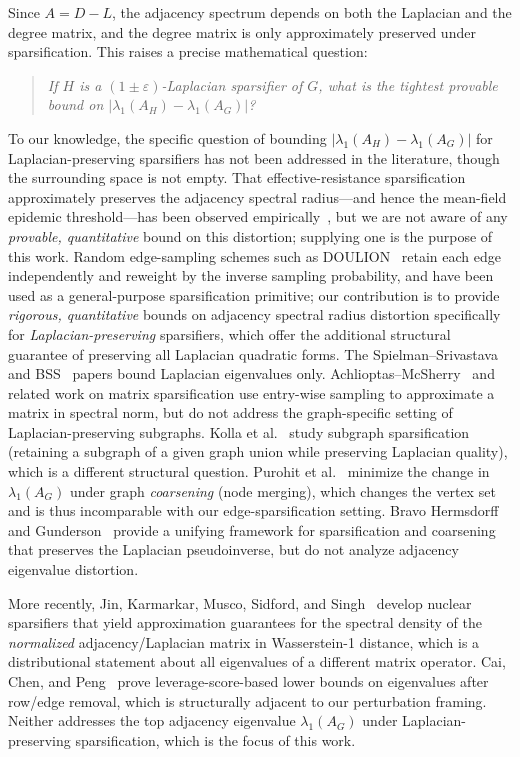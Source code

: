 \documentclass[11pt]{article}
\theoremstyle{definition}
\newcommand{\eps}{\varepsilon}
\newcommand{\lamH}{\lambda_1(A_H)}
\newcommand{\lamG}{\lambda_1(A_G)}
\begin{document}
Since $A = D - L$, the adjacency spectrum depends on both the Laplacian and the degree
matrix, and the degree matrix is only approximately preserved under sparsification. This
raises a precise mathematical question:

\begin{quote}
\emph{If $H$ is a $(1 \pm \eps)$-Laplacian sparsifier of $G$, what is the tightest
provable bound on $|\lamH - \lamG|$?}
\end{quote}

\noindent To our knowledge, the specific question of bounding $|\lamH - \lamG|$ for
Laplacian-preserving sparsifiers has not been addressed in the literature, though the
surrounding space is not empty. That effective-resistance sparsification approximately
preserves the adjacency spectral radius---and hence the mean-field epidemic
threshold---has been observed empirically~\citep{mercier2022effective}, but we are not
aware of any \emph{provable, quantitative} bound on this distortion; supplying one is
the purpose of this work.
Random edge-sampling schemes such as DOULION~\citep{tsourakakis2009doulion}
retain each edge independently and reweight by the inverse sampling probability,
and have been used as a general-purpose sparsification primitive; our contribution
is to provide \emph{rigorous, quantitative} bounds on adjacency spectral radius
distortion specifically for \emph{Laplacian-preserving} sparsifiers, which offer
the additional structural guarantee of preserving all Laplacian quadratic forms.
The Spielman--Srivastava and
BSS~\citep{batson2012twice} papers bound Laplacian eigenvalues only.
Achlioptas--McSherry~\citep{achlioptas2007fast} and related work on matrix sparsification
use entry-wise sampling to approximate a matrix in spectral norm, but do not address the
graph-specific setting of Laplacian-preserving subgraphs. Kolla et
al.~\citep{kolla2010subgraph} study subgraph sparsification (retaining a subgraph of a
given graph union while preserving Laplacian quality), which is a different structural
question. Purohit et al.~\citep{purohit2014fast} minimize the change in $\lamG$ under
graph \emph{coarsening} (node merging), which changes the vertex set and is thus
incomparable with our edge-sparsification setting. Bravo Hermsdorff and
Gunderson~\citep{bravo2019unifying} provide a unifying framework for sparsification and
coarsening that preserves the Laplacian pseudoinverse, but do not analyze adjacency
eigenvalue distortion.

More recently, Jin, Karmarkar, Musco, Sidford, and Singh~\citep{jin2024spectrum}
develop nuclear sparsifiers that yield approximation guarantees for the
spectral density of the \emph{normalized} adjacency/Laplacian matrix in Wasserstein-1
distance, which is a distributional statement about all eigenvalues of a different
matrix operator. Cai, Chen,
and Peng~\citep{cai2023effective} prove leverage-score-based lower bounds on eigenvalues
after row/edge removal, which is structurally adjacent to our perturbation framing.
Neither addresses the top adjacency eigenvalue $\lamG$ under Laplacian-preserving
sparsification, which is the focus of this work.
\end{document}
